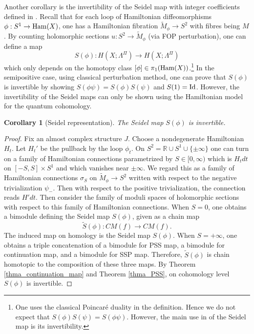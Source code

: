\documentclass[reqno, 10pt]{amsart}
\numberwithin{equation}{section}
\numberwithin{equation}{section}
\newtheorem{cor}[thm]{Corollary}
\theoremstyle{definition}
\theoremstyle{remark}
\newcommand{\beqn}{\begin{equation*}}
\newcommand{\eeqn}{\end{equation*}}
\newcommand{\mb}{\mathbb}
\newcommand{\wt}{\widetilde}
\begin{document}
Another corollary is the invertibility of the Seidel map with integer coefficients defined in \cite{BPX}. Recall that for each loop of Hamiltonian diffeomorphisms $\phi: S^1 \to {\rm Ham}(X)$, one has a Hamiltonian fibration $\wt M_\phi \to S^2$ with fibres being $M$. By counting holomorphic sections $u: S^2 \to \wt M_\phi$ (via FOP perturbation), one can define a map
\beqn
S(\phi): H(X; \Lambda^\Pi) \to H(X; \Lambda^\Pi)
\eeqn
which only depends on the homotopy class $[\phi] \in \pi_1({\rm Ham}(X))$.\footnote{One uses the classical Poincar\'e duality in the definition. Hence we do not expect that $S(\phi) S(\psi) = S(\phi \psi)$. However, the main use in \cite{BPX} of the Seidel map is its invertibility.} In the semipositive case, using classical perturbation method, one can prove that $S(\phi)$ is invertible by showing $S(\phi \psi) = S(\phi) S(\psi)$ and $S(1) = {\rm Id}$. However, the invertibility of the Seidel maps can only be shown using the Hamiltonian model for the quantum cohomology. 



\begin{cor}[Seidel representation]
The Seidel map $S(\phi)$ is invertible.
\end{cor}

\begin{proof}
Fix an almost complex structure $J$. Choose a nondegenerate Hamiltonian $H_t$. Let $H_t'$ be the pullback by the loop $\phi_t$. On $S^2 = {\mb R} \cup S^1 \cup \{\pm\infty\}$ one can turn on a family of Hamiltonian connections parametrized by $S \in [0, \infty)$ which is $H_t dt$ on $[-S, S] \times S^1$ and which vanishes near $\pm\infty$. We regard this as a family of Hamiltonian connections $\sigma_S$ on $\wt M_\phi \to S^2$ written with respect to the negative trivialization $\psi_-$. Then with respect to the positive trivialization, the connection reads $H' dt$. Then consider the family of moduli spaces of holomorphic sections with respect to this family of Hamiltonian connections. When $S = 0$, one obtains a bimodule defining the Seidel map $S(\phi)$, given as a chain map
\beqn
\tilde S(\phi): CM (f) \to CM(f).
\eeqn
The induced map on homology is the Seidel map $S(\phi)$. When $S = +\infty$, one obtains a triple concatenation of a bimodule for PSS map, a bimodule for continuation map, and a bimodule for SSP map. Therefore, $\tilde S(\phi)$ is chain homotopic to the composition of these three maps. By Theorem \ref{thma_continuation_map} and Theorem \ref{thma_PSS}, on cohomology level $S(\phi)$ is invertible.
\end{proof}
\end{document}
